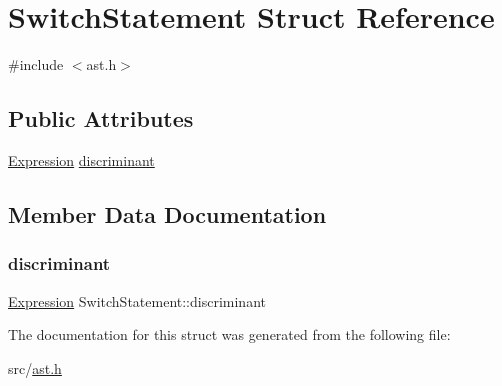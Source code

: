 \hypertarget{struct_switch_statement}{}\section{Switch\+Statement Struct Reference}
\label{struct_switch_statement}


{\ttfamily \#include $<$ast.\+h$>$}

\subsection*{Public Attributes}
\begin{DoxyCompactItemize}
\item 
\hyperlink{ast_8h_a4cb273a4d960cd13ea17d08f254493e8}{Expression} \hyperlink{struct_switch_statement_a04e5de9f570c5f2351f9a2268f5eaffe}{discriminant}
\end{DoxyCompactItemize}


\subsection{Member Data Documentation}
\mbox{\label{struct_switch_statement_a04e5de9f570c5f2351f9a2268f5eaffe}} 
\subsubsection{\texorpdfstring{discriminant}{discriminant}}
{\footnotesize\ttfamily \hyperlink{ast_8h_a4cb273a4d960cd13ea17d08f254493e8}{Expression} Switch\+Statement\+::discriminant}



The documentation for this struct was generated from the following file\+:\begin{DoxyCompactItemize}
\item 
src/\hyperlink{ast_8h}{ast.\+h}\end{DoxyCompactItemize}
